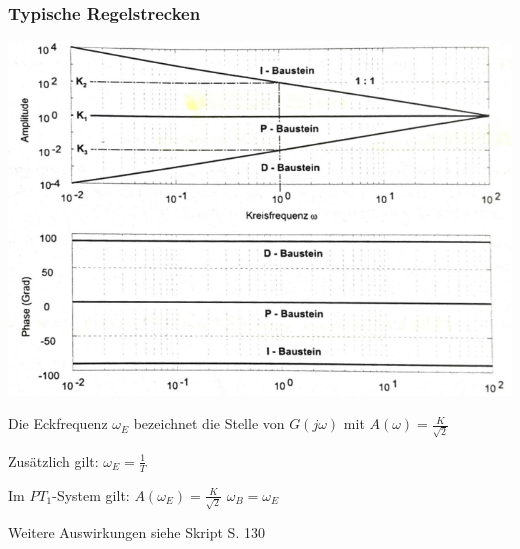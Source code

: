 \documentclass[fs, footer]{latex4ei}
\begin{document}
\begin{multicols*}{4}
{	

	\subsubsection{Typische Regelstrecken}
	
	\includegraphics[width=\columnwidth]{img/Bode-Diagramme_Regler.pdf}
	
	Die Eckfrequenz $\omega_E$ bezeichnet die Stelle von $G(j\omega)$ mit $A(\omega)=\frac{K}{\sqrt{2}}$
	
	Zusätzlich gilt: $\omega_E = \frac 1 T$
	
	Im $PT_1$-System gilt:
	$A (\omega_E) = \frac{K}{\sqrt 2}$ \quad $\omega_B = \omega_E$
	
	Weitere Auswirkungen siehe Skript S. 130
}


\end{multicols*}
\end{document}
